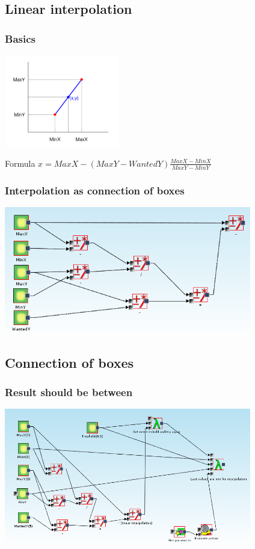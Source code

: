 \documentclass{beamer}
\begin{document}
\subsection{Linear interpolation}
\begin{frame}
	\frametitle{Basics}
	
	\includegraphics[width=5cm]{linearInterpolationPlot}
	\begin{block}{Formula}
		$x = MaxX - (MaxY-WantedY)\frac{MaxX - MinX}{MaxY - MinY}$
	\end{block}
\end{frame}

\begin{frame}
	\frametitle{Interpolation as connection of boxes}
	\includegraphics[width=10.8cm]{linearInterpolation}
\end{frame}

\subsection{Connection of boxes}
\begin{frame}
	\frametitle{Result should be between}
	\includegraphics[width=10.8cm]{exampleMainRecursionPart}
\end{frame}
\end{document}
